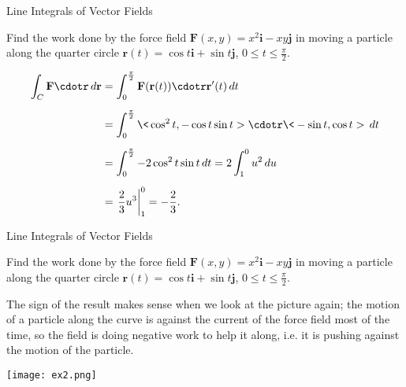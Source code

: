 \documentclass[11pt,english,
handout
]{beamer}
\begin{document}
\begin{frame}[t]{Line Integrals of Vector Fields}
\small

\begin{example}
Find the work done by the force field $\mathbf{F}(x,y)=x^2\mathbf{i}-xy\mathbf{j}$ in moving a particle along the quarter circle $\mathbf{r}(t)=\cos t\mathbf{i}+\sin t\mathbf{j}$, $0\leq t \leq \frac{\pi}{2}$.

\begin{align*}
\int_C\mathbf{F}\cdotr\,d\mathbf{r}&= \int_0^{\frac{\pi}{2}}\mathbf{F}(\mathbf{r}(t))\cdotr\mathbf{r}'(t)\,dt\\[2mm]
&=\int_0^{\frac{\pi}{2}}\<\cos^2t,-\cos t\sin t>\cdotr\<-\sin t,\cos t>\,dt\\[2mm]
&=\int_0^{\frac{\pi}{2}}-2\cos^2t\sin t\,dt=2\int_1^0u^2\,du\\[2mm]
&=\left.\frac{2}{3}u^3\right|_1^0=-\frac{2}{3}.
\end{align*}

\end{example}
\end{frame}













\begin{frame}[t]{Line Integrals of Vector Fields}
\small

\begin{example}
Find the work done by the force field $\mathbf{F}(x,y)=x^2\mathbf{i}-xy\mathbf{j}$ in moving a particle along the quarter circle $\mathbf{r}(t)=\cos t\mathbf{i}+\sin t\mathbf{j}$, $0\leq t \leq \frac{\pi}{2}$.

\lspace
\begin{minipage}{0.5\textwidth}
The sign of the result makes sense when we look at the picture again; the motion of a particle along the curve is against the current of the force field most of the time, so the field is doing negative work to help it along, i.e. it is pushing against the motion of the particle.
\end{minipage}%
\begin{minipage}{0.5\textwidth}
\centering
\texttt{[image: ex2.png]}
\end{minipage}

\end{example}
\end{frame}
\end{document}
